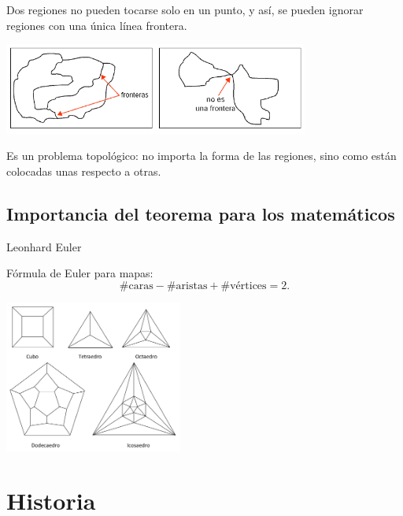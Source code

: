 \documentclass[spanish,utf8]{beamer}
\begin{document}
\begin{frame}{\insertsection}
\begin{block}{}
Dos regiones no pueden tocarse solo en un punto, y así, se pueden ignorar regiones con una única línea frontera.
\end{block}
\begin{center}
\includegraphics[height=3cm]{fronteras.png}
\end{center}

\begin{block}{}
Es un problema topológico: no importa la forma de las regiones, sino como están colocadas unas respecto a otras.
\end{block}
\end{frame}
\subsection{Importancia del teorema para los matemáticos}

\begin{frame}{\insertsection}\transblindsvertical
Leonhard Euler
\begin{block}{Fórmula de Euler para mapas:}
$$
\#\text{caras} - \#\text{aristas} + \#\text{vértices} = 2.
$$
\end{block}
\begin{center}
   \includegraphics[height=5cm]{poliedros2.jpg}
\end{center}
\end{frame}

\section{Historia}
\end{document}
